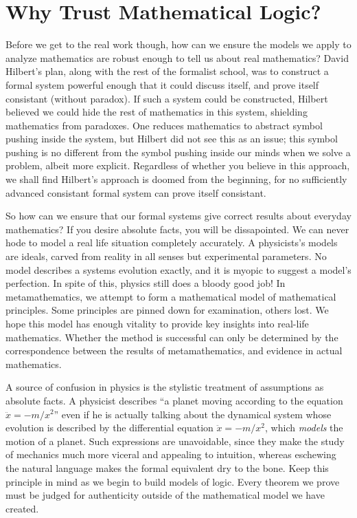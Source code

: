 \section{Why Trust Mathematical Logic?}

Before we get to the real work though, how can we ensure the models we apply to analyze mathematics are robust enough to tell us about real mathematics? David Hilbert's plan, along with the rest of the formalist school, was to construct a formal system powerful enough that it could discuss itself, and prove itself consistant (without paradox). If such a system could be constructed, Hilbert believed we could hide the rest of mathematics in this system, shielding mathematics from paradoxes. One reduces mathematics to abstract symbol pushing inside the system, but Hilbert did not see this as an issue; this symbol pushing is no different from the symbol pushing inside our minds when we solve a problem, albeit more explicit. Regardless of whether you believe in this approach, we shall find Hilbert's approach is doomed from the beginning, for no sufficiently advanced consistant formal system can prove itself consistant.

So how can we ensure that our formal systems give correct results about everyday mathematics? If you desire absolute facts, you will be dissapointed. We can never hode to model a real life situation completely accurately. A physicists's models are ideals, carved from reality in all senses but experimental parameters. No model describes a systems evolution exactly, and it is myopic to suggest a model's perfection. In spite of this, physics still does a bloody good job! In metamathematics, we attempt to form a mathematical model of mathematical principles. Some principles are pinned down for examination, others lost. We hope this model has enough vitality to provide key insights into real-life mathematics. Whether the method is successful can only be determined by the correspondence between the results of metamathematics, and evidence in actual mathematics.

A source of confusion in physics is the stylistic treatment of assumptions as absolute facts. A physicist describes ``a planet moving according to the equation $\ddot{x} = -m/x^2$'' even if he is actually talking about the dynamical system whose evolution is described by the differential equation $\ddot{x} = -m/x^2$, which {\it models} the motion of a planet. Such expressions are unavoidable, since they make the study of mechanics much more viceral and appealing to intuition, whereas eschewing the natural language makes the formal equivalent dry to the bone. Keep this principle in mind as we begin to build models of logic. Every theorem we prove must be judged for authenticity outside of the mathematical model we have created.






